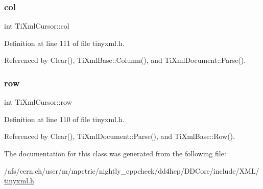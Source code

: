 \subsubsection{\texorpdfstring{col}{col}}
{\footnotesize\ttfamily int Ti\+Xml\+Cursor\+::col}



Definition at line 111 of file tinyxml.\+h.



Referenced by Clear(), Ti\+Xml\+Base\+::\+Column(), and Ti\+Xml\+Document\+::\+Parse().

\hypertarget{struct_ti_xml_cursor_a5b54dd949820c2db061e2be41f3effb3}{}\label{struct_ti_xml_cursor_a5b54dd949820c2db061e2be41f3effb3} 
\subsubsection{\texorpdfstring{row}{row}}
{\footnotesize\ttfamily int Ti\+Xml\+Cursor\+::row}



Definition at line 110 of file tinyxml.\+h.



Referenced by Clear(), Ti\+Xml\+Document\+::\+Parse(), and Ti\+Xml\+Base\+::\+Row().



The documentation for this class was generated from the following file\+:\begin{DoxyCompactItemize}
\item 
/afs/cern.\+ch/user/m/mpetric/nightly\+\_\+cppcheck/dd4hep/\+D\+D\+Core/include/\+X\+M\+L/\hyperlink{tinyxml_8h}{tinyxml.\+h}\end{DoxyCompactItemize}
